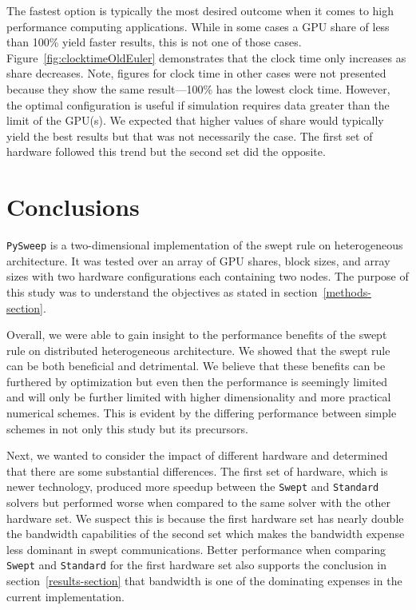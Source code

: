 \documentclass[journal,article,submit,moreauthors,pdftex]{Definitions/mdpi}
\def\pysweep{\texttt{PySweep}}
\def\Swept{\texttt{Swept}}
\def\Standard{\texttt{Standard}}
\begin{document}
\begin{paracol}{2}
\linenumbers
\switchcolumn
The fastest option is typically the most desired outcome when it comes to high performance computing applications. While in some cases a GPU share of less than 100\% yield faster results, this is not one of those cases. Figure~\ref{fig:clocktimeOldEuler} demonstrates that the clock time only increases as share decreases. Note, figures for clock time in other cases were not presented because they show the same result---100\% has the lowest clock time. However, the optimal configuration is useful if simulation requires data greater than the limit of the GPU(s). We expected that higher values of share would typically yield the best results but that was not necessarily the case. The first set of hardware followed this trend but the second set did the opposite. 

\section{Conclusions}

\label{conclusions-section}
\pysweep{} is a two-dimensional implementation of the swept rule on heterogeneous architecture. It was tested over an array of GPU shares, block sizes, and array sizes with two hardware configurations each containing two nodes. The purpose of this study was to understand the objectives as stated in section~\ref{methods-section}.

Overall, we were able to gain insight to the performance benefits of the swept rule on distributed heterogeneous architecture. We showed that the swept rule can be both beneficial and detrimental. We believe that these benefits can be furthered by optimization but even then the performance is seemingly limited and will only be further limited with higher dimensionality and more practical numerical schemes. This is evident by the differing performance between simple schemes in not only this study but its precursors.

Next, we wanted to consider the impact of different hardware and determined that there are some substantial differences. The first set of hardware, which is newer technology, produced more speedup between the \Swept{} and \Standard{} solvers but performed worse when compared to the same solver with the other hardware set. We suspect this is because the first hardware set has nearly double the bandwidth capabilities of the second set which makes the bandwidth expense less dominant in swept communications. Better performance when comparing \Swept{} and \Standard{} for the first hardware set also supports the conclusion in section~\ref{results-section} that bandwidth is one of the dominating expenses in the current implementation.


\end{paracol}
\end{document}
